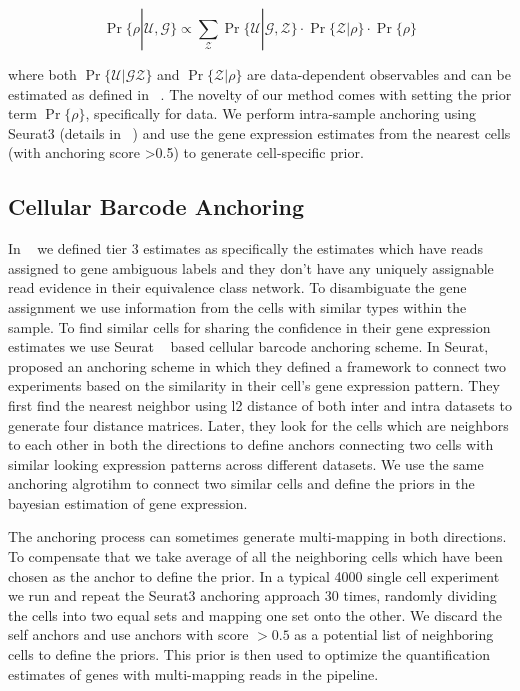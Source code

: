 \begin{equation}
    \Pr \{ \rho | \mathcal{U}, \mathcal{G} \} 
    \propto \sum_{\mathcal{Z}} \Pr\{ \mathcal{U} | \mathcal{G}, \mathcal{Z} \}
    \cdot \Pr\{ \mathcal{Z} | \rho \} \cdot \Pr\{ \rho \}
\end{equation}

where both $\Pr\{ \mathcal{U} | \mathcal{G} \mathcal{Z} \}$ and $\Pr\{ \mathcal{Z} | \rho \}$ are 
data-dependent observables and can be estimated as defined in ~\citet{salmon}. The novelty of our method
comes with setting the prior term $\Pr\{ \rho \}$, specifically for \dscrnaseq data. We perform
intra-sample anchoring using Seurat3 (details in ~) and use the gene expression
estimates from the nearest cells (with anchoring score >0.5) to generate cell-specific prior.

\subsection{Cellular Barcode Anchoring}
\label{subsec:anchor}
In ~ we defined tier 3 estimates as specifically the estimates which have reads assigned 
to gene ambiguous labels and they don't have any uniquely assignable read evidence in their equivalence 
class network. To disambiguate the gene assignment we use 
information from the cells with similar types within the sample. To find similar cells for sharing 
the confidence in their gene expression estimates we use Seurat ~\citep{seurat3} based cellular
barcode anchoring scheme. In Seurat, ~\citet{seurat3} proposed an anchoring scheme in which they 
defined a framework to connect two experiments based on the similarity in their cell's gene expression 
pattern. They first find the nearest neighbor using l2 distance of both inter and intra datasets to generate 
four distance matrices. Later, they look for the cells which are neighbors to each other in both 
the directions to define anchors connecting two cells with similar looking expression patterns 
across different \singlecell datasets. We use the same anchoring algrotihm to connect two similar 
cells and define the priors in the bayesian estimation of gene expression.

The anchoring process can sometimes generate multi-mapping in both directions. To compensate that we take average 
of all the neighboring cells which have been chosen as the anchor to define the prior. In a typical 4000 single 
cell experiment we run \alevin and repeat the Seurat3 anchoring approach $30$ times, randomly dividing 
the cells into two equal sets and mapping one set onto the other. We discard the self anchors and use 
anchors with score $>0.5$ as a potential list of neighboring cells to define the priors. This prior 
is then used to optimize the quantification estimates of genes with multi-mapping reads in the \alevin 
pipeline.

